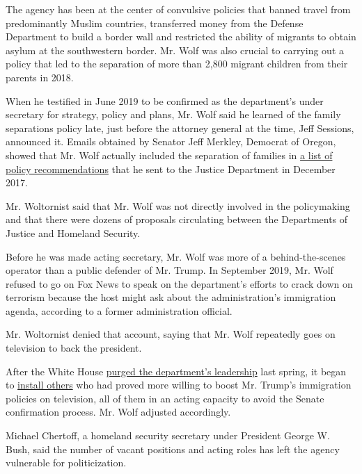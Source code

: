 The agency has been at the center of convulsive policies that banned
travel from predominantly Muslim countries, transferred money from the
Defense Department to build a border wall and restricted the ability of
migrants to obtain asylum at the southwestern border. Mr. Wolf was also
crucial to carrying out a policy that led to the separation of more than
2,800 migrant children from their parents in 2018.

When he testified in June 2019 to be confirmed as the department's under
secretary for strategy, policy and plans, Mr. Wolf said he learned of
the family separations policy late, just before the attorney general at
the time, Jeff Sessions, announced it. Emails obtained by Senator Jeff
Merkley, Democrat of Oregon, showed that Mr. Wolf actually included the
separation of families in
\href{https://www.nbcnews.com/politics/immigration/watchdog-group-trump-dhs-pick-made-false-claims-about-role-n1078171}{a
list of policy recommendations} that he sent to the Justice Department
in December 2017.

Mr. Woltornist said that Mr. Wolf was not directly involved in the
policymaking and that there were dozens of proposals circulating between
the Departments of Justice and Homeland Security.

Before he was made acting secretary, Mr. Wolf was more of a
behind-the-scenes operator than a public defender of Mr. Trump. In
September 2019, Mr. Wolf refused to go on Fox News to speak on the
department's efforts to crack down on terrorism because the host might
ask about the administration's immigration agenda, according to a former
administration official.

Mr. Woltornist denied that account, saying that Mr. Wolf repeatedly goes
on television to back the president.

After the White House
\href{https://www.nytimes.com/2019/04/08/us/politics/randolph-alles-secret-service.html}{purged
the department's leadership} last spring, it began to
\href{https://www.nytimes.com/2019/09/05/us/politics/ken-cuccinelli-immigration-trump.html}{install
others} who had proved more willing to boost Mr. Trump's immigration
policies on television, all of them in an acting capacity to avoid the
Senate confirmation process. Mr. Wolf adjusted accordingly.

Michael Chertoff, a homeland security secretary under President George
W. Bush, said the number of vacant positions and acting roles has left
the agency vulnerable for politicization.

